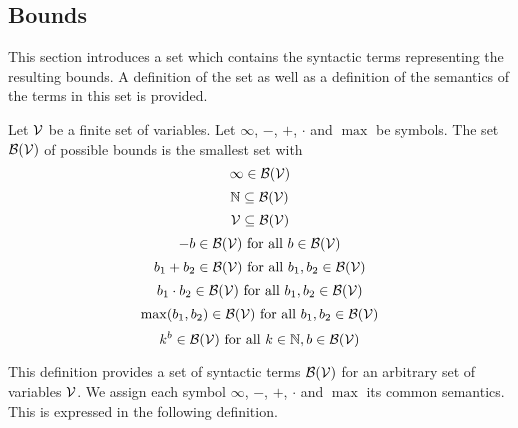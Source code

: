 \subsection{Bounds}

This section introduces a set which contains the syntactic terms representing the resulting bounds.
A definition of the set as well as a definition of the semantics of the terms in this set is provided.

\begin{definition}
  Let $\mathcal{V}$ be a finite set of variables.
  Let $\infty$, $-$, $+$, $\cdot$ and $\max$ be symbols.
  The set $\mathcal{B}(\mathcal{V})$ of possible bounds is the smallest set with
  \[ \infty \in \mathcal{B}(\mathcal{V}) \]
  \[ \mathbb{N} \subseteq \mathcal{B}(\mathcal{V}) \] 
  \[ \mathcal{V} \subseteq \mathcal{B}(\mathcal{V}) \] 
  \[ -b \in \mathcal{B}(\mathcal{V}) \text{ for all } b \in \mathcal{B}(\mathcal{V}) \] 
  \[ b_1 + b_2 \in \mathcal{B}(\mathcal{V}) \text{ for all } b_1, b_2 \in \mathcal{B}(\mathcal{V}) \] 
  \[ b_1 \cdot b_2 \in \mathcal{B}(\mathcal{V}) \text{ for all } b_1, b_2 \in \mathcal{B}(\mathcal{V}) \] 
  \[ \max(b_1, b_2) \in \mathcal{B}(\mathcal{V}) \text{ for all } b_1, b_2 \in \mathcal{B}(\mathcal{V}) \]
  \[ k^b \in \mathcal{B}(\mathcal{V}) \text{ for all } k \in \mathbb{N}, b \in \mathcal{B}(\mathcal{V}) \]
\end{definition}
This definition provides a set of syntactic terms $\mathcal{B}(\mathcal{V})$ for an arbitrary set of variables $\mathcal{V}$.
We assign each symbol $\infty$, $-$, $+$, $\cdot$ and $\max$ its common semantics.
This is expressed in the following definition.

